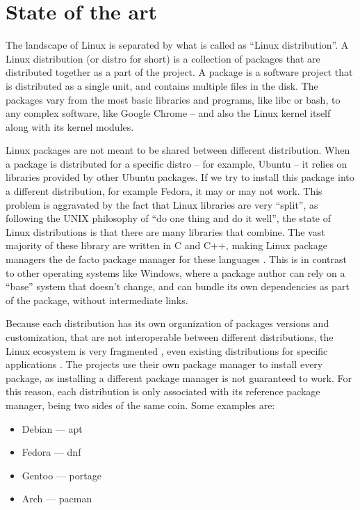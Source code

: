 \chapter{State of the art}

The landscape of Linux is separated by what is called as
``Linux distribution''. A Linux distribution (or distro for
short) is a collection of packages that are distributed
together as a part of the project. A package is a software
project that is distributed as a single unit, and contains
multiple files in the disk. The packages vary from the most
basic libraries and programs, like libc or bash, to any
complex software, like Google Chrome -- and also the Linux
kernel itself along with its kernel modules.

Linux packages are not meant to be shared between different
distribution. When a package is distributed for a specific
distro -- for example, Ubuntu -- it relies on libraries
provided by other Ubuntu packages. If we try to install this
package into a different distribution, for example Fedora,
it may or may not work. This problem is aggravated by the
fact that Linux libraries are very ``split'', as following
the UNIX philosophy of ``do one thing and do it well'', the
state of Linux distributions is that there are many
libraries that combine. The vast majority of these library
are written in C and C++, making Linux package managers the
de facto package manager for these languages
\cite{amor-iglesiasMeasuringLibreSoftware2005} . This is in
contrast to
other operating systems like Windows, where a package author
can rely on a ``base'' system that doesn't change, and can
bundle its own dependencies as part of the package, without
intermediate links.

Because each distribution has its own organization of
packages versions and customization, that are not
interoperable between different distributions, the Linux
ecosystem is very fragmented
\cite{espePerformanceEvaluationContainer2020}, even existing
distributions for specific applications
\cite{nemotoLin4NeuroCustomizedLinux2011} . The projects
use their own
package manager to install every package, as installing a
different package manager is not guaranteed to work. For
this reason, each distribution is only associated with its
reference package manager, being two sides of the same coin.
Some examples are:

\begin{itemize}
    \item Debian --- apt
    \item Fedora --- dnf
    \item Gentoo --- portage
    \item Arch --- pacman
\end{itemize}

